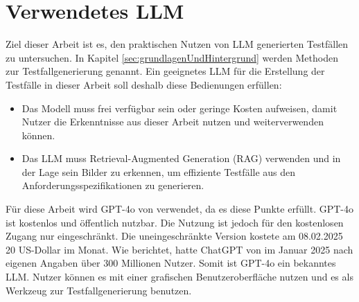 \documentclass[12pt,toc=bib,toc=listof]{scrreprt}
\begin{document}
\section{Verwendetes LLM} %
\label{sec:verwendetesLLM}
Ziel dieser Arbeit ist es, den praktischen Nutzen von LLM generierten Testfällen zu untersuchen. In Kapitel \ref{sec:grundlagenUndHintergrund} werden Methoden zur Testfallgenerierung genannt. Ein geeignetes LLM für die Erstellung der Testfälle in dieser Arbeit soll deshalb diese  Bedienungen erfüllen:
\begin{itemize}
    \item Das Modell muss frei verfügbar sein oder geringe Kosten aufweisen, damit Nutzer die Erkenntnisse aus dieser Arbeit nutzen und weiterverwenden können.
    \item Das LLM muss Retrieval-Augmented Generation (RAG) verwenden und in der Lage sein Bilder zu erkennen, um effiziente Testfälle aus den Anforderungsspezifikationen zu generieren.
\end{itemize}
Für diese Arbeit wird GPT-4o von \textcite{OpenAI2025} verwendet, da es diese Punkte erfüllt. GPT-4o ist kostenlos und öffentlich nutzbar. Die Nutzung ist jedoch für den kostenlosen Zugang nur eingeschränkt. Die uneingeschränkte Version kostete am 08.02.2025 20 US-Dollar im Monat. Wie \textcite{Backlinko2025} berichtet, hatte ChatGPT von \textcite{OpenAI2025} im Januar 2025 nach eigenen Angaben über 300 Millionen Nutzer. Somit ist GPT-4o ein bekanntes LLM. Nutzer können es mit einer grafischen Benutzeroberfläche nutzen und es als Werkzeug zur Testfallgenerierung benutzen.
\newpage
\end{document}
